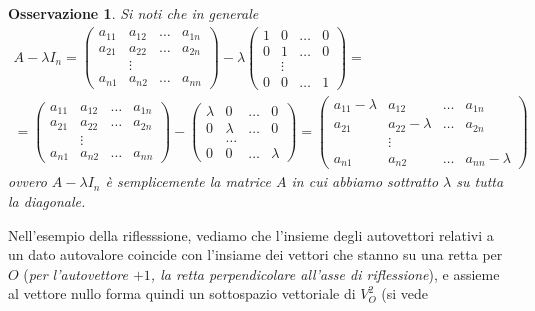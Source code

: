 \documentclass{book}
\newtheorem{osservazione}{Osservazione}[section]
\begin{document}
\begin{osservazione}
  Si noti che in generale
  \begin{eqnarray*}
    A-\lambda I_n=
    \begin{pmatrix}
      a_{11} & a_{12} &\dots & a_{1n}\\
      a_{21} & a_{22} & \dots & a_{2n}\\
             & \vdots \\
      a_{n1} & a_{n2} & \dots & a_{nn}
    \end{pmatrix} - \lambda
    \begin{pmatrix}
      1 & 0 &\dots & 0\\
      0 & 1 & \dots & 0 \\
        & \vdots\\
      0 & 0 & \dots & 1
    \end{pmatrix} =\\
    = \begin{pmatrix}
      a_{11} & a_{12} &\dots & a_{1n}\\
      a_{21} & a_{22} & \dots & a_{2n}\\
             & \vdots \\
      a_{n1} & a_{n2} & \dots & a_{nn}
      \end{pmatrix} -
    \begin{pmatrix}
      \lambda & 0 & \dots & 0\\
      0 & \lambda & \dots & 0\\
              & \dots\\
      0 & 0 & \dots & \lambda
    \end{pmatrix} =
    \begin{pmatrix}
      a_{11}-\lambda & a_{12} & \dots & a_{1n}\\
      a_{21} & a_{22}-\lambda &\dots & a_{2n} \\
                     & \vdots \\
      a_{n1} & a_{n2} & \dots & a_{nn} -\lambda
    \end{pmatrix}
  \end{eqnarray*}
  ovvero $A-\lambda I_n$ è semplicemente la matrice $A$ in cui abbiamo sottratto $\lambda$ su tutta la diagonale.
\end{osservazione}
Nell'esempio della riflesssione, vediamo che l'insieme degli autovettori relativi a un dato autovalore coincide
con l'insiame dei vettori che stanno su una retta per $O$ (\textit{per l'autovettore $+1$, la retta perpendicolare
  all'asse di riflessione}), e assieme al vettore nullo forma quindi un sottospazio vettoriale di $V_O^2$ (si vede
\end{document}
